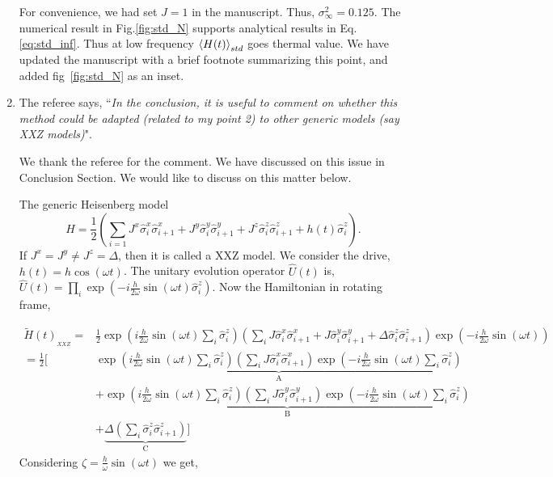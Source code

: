 \documentclass[aps,prb,reprint,showpacs,floatfix,superscriptaddress, onecolumn, nofootinbib, 9pt]{revtex4-2}
\newcommand{\response}[1]{{\color{black}#1}} %
\newcommand{\comment}[1]{{\color{blue}#1}} %
\begin{document}
\begin{enumerate}
{For convenience, we had set $J=1$ in the manuscript. Thus, $\sigma_\infty^2 = 0.125$. The numerical result in Fig.\ref{fig:std_N} supports analytical results in Eq. \eqref{eq:std_inf}. Thus at low frequency $\expval{H(t)}_{std}$ goes thermal value. We have updated the manuscript with a brief footnote summarizing this point, and added fig~\ref{fig:std_N} as an inset.
}


\vskip 2cm
\item The referee says, \comment{``\textit{In the conclusion, it is useful to comment on whether this method could be adapted (related to my point 2) to other generic models (say XXZ models)}"}.\\

\response{
We thank the referee for the comment. We have discussed on this issue in Conclusion Section. We would like to discuss on this matter below. 

The generic Heisenberg model
\begin{equation*}
	H = \frac12 \left( \sum_{i=1} J^x \hat{\sigma}^x_i \hat{\sigma}^x_{i+1} +J^y  \hat{\sigma}^y_i \hat{\sigma}^y_{i+1} + J^z  \hat{\sigma}^z_i \hat{\sigma}^z_{i+1} + h(t)  \hat{\sigma}^z_i\right).
\end{equation*}
If $J^x= J^y \neq J^z=\Delta$, then it is called a XXZ model. We consider the drive, $h(t) = h \cos(\omega t)$. The unitary evolution operator $\displaystyle \hat{U}(t)$ is, $\hat{U}(t)=\prod_{i} \exp \left(-i \frac{h}{2 \omega} \sin (\omega t) \hat{\sigma}_{i}^{z}\right)$. Now the Hamiltonian in rotating frame,
	
\begin{align}
	\tilde{H}(t)_{_{XXZ}}= & \frac{1}{2} \exp \left(i \frac{h}{2 \omega} \sin (\omega t) \sum_{i} \hat{\sigma}_{i}^{z}\right)\left(\sum_{i} J \hat{\sigma}^x_i \hat{\sigma}^x_{i+1} + J \hat{\sigma}^y_i \hat{\sigma}^y_{i+1}+ \Delta  \hat{\sigma}^z_i \hat{\sigma}^z_{i+1}\right) \exp \left(-i \frac{h}{2 \omega} \sin (\omega t)\right)\nonumber\\
	= \frac12 \Bigg[& \underbrace{\exp \left(i \frac{h}{2 \omega} \sin (\omega t) \sum_{i} \hat{\sigma}_{i}^{z}\right)\left(\sum_{i} J \hat{\sigma}_{i}^{x} \hat{\sigma}_{i+1}^{x}\right) \exp \left(-i \frac{h}{2 \omega} \sin (\omega t) \sum_i\hat{\sigma}_{i}^{z}\right)}_{\mathrm{A}} \nonumber\\
	& +\underbrace{\exp \left(i \frac{h}{2 \omega} \sin (\omega t) \sum_{i} \hat{\sigma}_{i}^{z}\right)\left(\sum_{i} J \hat{\sigma}_{i}^{y} \hat{\sigma}_{i+1}^{y}\right) \exp \left(-i \frac{h}{2 \omega} \sin (\omega t) \sum_i\hat{\sigma}_{i}^{z}\right)}_{\mathrm{B}} \nonumber\\
	& +\underbrace{\Delta \left(\sum_{i}  \hat{\sigma}_{i}^{z} \hat{\sigma}_{i+1}^{z}\right)}_{\mathrm{C}}\Bigg]
	\label{eq:xxz1}
\end{align}
Considering $\zeta = \frac{h}{\omega}\sin(\omega t)$ we get,

}
\end{enumerate}
\end{document}
